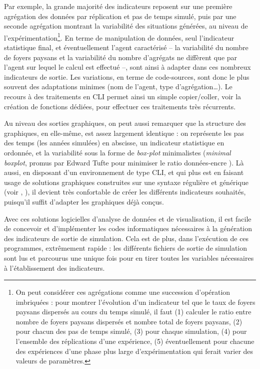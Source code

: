 	Par exemple, la grande majorité des indicateurs reposent sur une première agrégation des données par réplication et pas de temps simulé, puis par une seconde agrégation montrant la variabilité des situations générées, au niveau de l'expérimentation\footnote{
	On peut considérer ces agrégations comme une succession d'opération imbriquées : pour montrer l'évolution d'un indicateur tel que le taux de foyers paysans dispersés au cours du temps simulé, il faut (1) calculer le ratio entre nombre de foyers paysans dispersés et nombre total de foyers paysans, (2) pour chacun des pas de temps simulé, (3) pour chaque simulation, (4) pour l'ensemble des réplications d'une expérience, (5) éventuellement pour chacune des expériences d'une phase plus large d'expérimentation qui ferait varier des valeurs de paramètres.
	}.
	En terme de manipulation de données, seul l'indicateur statistique final, et éventuellement l'agent caractérisé -- la variabilité du nombre de foyers paysans et la variabilité du nombre d'agrégats ne diffèrent que par l'agent sur lequel le calcul est effectué --, sont ainsi à adapter dans ces nombreux indicateurs de sortie.
	Les variations, en terme de code-sources, sont donc le plus souvent des adaptations minimes (nom de l'agent, type d'agrégation\ldots).
	Le recours à des traitements en CLI permet ainsi un simple copier/coller, voir la création de fonctions dédiées, pour effectuer ces traitements très récurrents.

	Au niveau des sorties graphiques, on peut aussi remarquer que la structure des graphiques, en elle-même, est assez largement identique : on représente les pas des temps (les années simulées) en abscisse, un indicateur statistique en ordonnée, et la variabilité sous la forme de \textit{box-plot} minimalistes (\og \textit{minimal boxplot}\fg{}, promus par Edward Tufte pour minimiser le ratio données-encre \autocite[123-125]{tufte_visual_2001}).
	Là aussi, en disposant d'un environnement de type CLI, et qui plus est en faisant usage de solutions graphiques construites sur une syntaxe régulière et générique (voir , ), il devient très confortable de créer les différents indicateurs souhaités, puisqu'il suffit d'adapter les graphiques déjà conçus.

	Avec ces solutions logicielles d'analyse de données et de visualisation, il est facile de concevoir et d'implémenter les codes informatiques nécessaires à la génération des indicateurs de sortie de simulation.
	Cela est de plus, dans l'exécution de ces programmes, extrêmement rapide :  les différents fichiers de sortie de simulation sont lus et parcourus une unique fois pour en tirer toutes les variables nécessaires à l'établissement des indicateurs.

